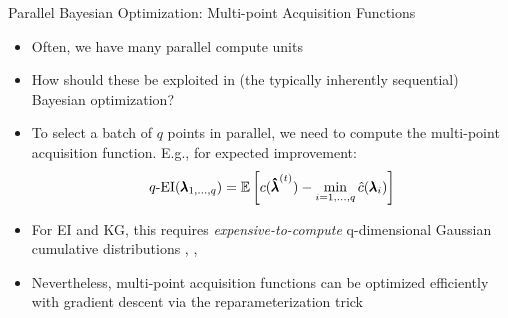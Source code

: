 \begin{frame}[c]{Parallel Bayesian Optimization: Multi-point Acquisition Functions}

\begin{itemize}
    \item Often, we have many parallel compute units
    \item How should these be exploited in (the typically inherently sequential) Bayesian optimization?
\medskip
\pause
    \item To select a batch of $q$ points in parallel, we need to compute the multi-point acquisition function.
    E.g., for expected improvement:
    \begin{equation*}
        q\text{-EI}(\pmb{\lambda}_{1, \dots, q}) = \operatorname*{\mathbb{E}} \left[ c({\pmb{\hat{\lambda}}}^{(t)}) - \min_{i=1, \dots, q} \hat{c}(\pmb{\lambda}_i) \right]
    \end{equation*}
\pause
\medskip
    \item For EI and KG, this requires \emph{expensive-to-compute} q-dimensional Gaussian cumulative distributions , , 
    \pause
    \item Nevertheless, multi-point acquisition functions can be optimized efficiently with gradient descent via the reparameterization trick 
\end{itemize}
\end{frame}


